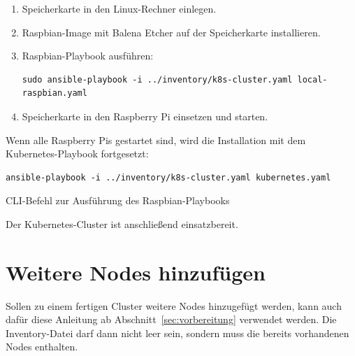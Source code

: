 \begin{enumerate}
    \item Speicherkarte in den Linux-Rechner einlegen.
    \item Raspbian-Image mit Balena Etcher auf der Speicherkarte installieren.
    \item Raspbian-Playbook ausführen:
        \begin{lstlisting}
sudo ansible-playbook -i ../inventory/k8s-cluster.yaml local-raspbian.yaml
\end{lstlisting}
    \item Speicherkarte in den Raspberry Pi einsetzen und starten.
\end{enumerate}

Wenn alle Raspberry Pis gestartet sind, wird die Installation mit dem Kubernetes-Playbook fortgesetzt:

\begin{lstlisting}
ansible-playbook -i ../inventory/k8s-cluster.yaml kubernetes.yaml
\end{lstlisting}
\caption{CLI-Befehl zur Ausführung des Raspbian-Playbooks}

Der Kubernetes-Cluster ist anschließend einsatzbereit.

\section{Weitere Nodes hinzufügen}\label{sec:weitere-nodes-hinzufügen}

Sollen zu einem fertigen Cluster weitere Nodes hinzugefügt werden, kann auch dafür diese Anleitung ab Abschnitt~\ref{sec:vorbereitung} verwendet werden.
Die Inventory-Datei darf dann nicht leer sein, sondern muss die bereits vorhandenen Nodes enthalten.
